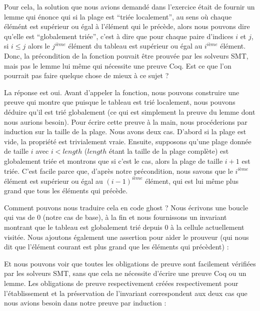 

Pour cela, la solution que nous avions demandé dans l'exercice était de fournir
un lemme qui énonce qui si la plage est ``triée localement'', au sens où chaque
élémént est supérieur ou égal à l'élément qui le précède, alors nous pouvons
dire qu'elle est ``globalement triée'', c'est à dire que pour chaque paire
d'indices $i$ et $j$, si $i \leq j$ alors le $j^{ième}$ élément du tableau est
supérieur ou égal au $i^{ième}$ élément. Donc, la précondition de la fonction
pouvait être prouvée par les solveurs SMT, mais pas le lemme lui même qui
nécessite une preuve Coq. Est ce que l'on pourrait pas faire quelque chose de
mieux à ce sujet ?


La réponse est oui. Avant d'appeler la fonction, nous pouvons construire une
preuve qui montre que puisque le tableau est trié localement, nous pouvons
déduire qu'il est trié globalement (ce qui est simplement la preuve du lemme
dont nous aurions besoin). Pour écrire cette preuve à la main, nous procéderions
par induction sur la taille de la plage. Nous avons deux cas. D'abord si la
plage est vide, la propriété est trivialement vraie. Ensuite, supposons qu'une 
plage donnée de taille $i$ avec $i < length$ ($length$ étant la taille de la 
plage complète) est globalement triée et montrons que si c'est le cas, alors la
plage de taille $i+1$ est triée. C'est facile parce que, d'après notre
précondition, nous savons que le $i^{ième}$ élément est supérieur ou égal au
$(i-1)^{ième}$ élément, qui est lui même plus grand que tous les éléments qui
précède.


Comment pouvons nous traduire cela en code ghost ? Nous écrivons une boucle qui
vas de $0$ (notre cas de base), à la fin  et nous fournissons
un invariant montrant que le tableau est globalement trié depuis $0$ à la cellule
actuellement visitée. Nous ajoutons également une assertion pour aider le
prouveur (qui nous dit que l'élément courant est plus grand que les éléments qui
précèdent) :






Et nous pouvons voir que toutes les obligations de preuve sont facilement
vérifiées par les solveurs SMT, sans que cela ne nécessite d'écrire une preuve Coq
ou un lemme. Les obligations de preuve respectivement créées respectivement pour
l'établissement et la préservation de l'invariant correspondent aux deux cas que
nous avions besoin dans notre preuve par induction :


